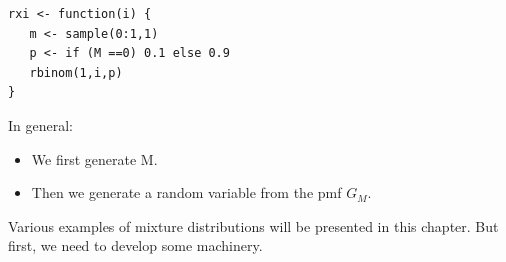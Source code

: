 \documentclass[11pt]{article}
\begin{document}
\begin{lstlisting}
rxi <- function(i) {
   m <- sample(0:1,1)
   p <- if (M ==0) 0.1 else 0.9
   rbinom(1,i,p)
}
\end{lstlisting}

In general:

\begin{itemize}

\item We first generate M.

\item Then we generate a random variable from the pmf $G_M$.

\end{itemize}

Various examples of mixture distributions will be presented in this
chapter.  But first, we need to develop some machinery.

% 
% 
% 
% 
% 
% 
% 
% 
% 
% 
% 
\end{document}
